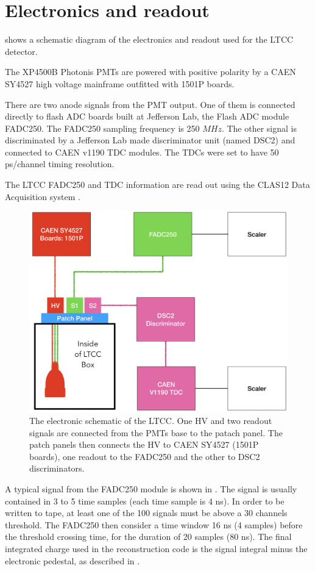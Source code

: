 \section{Electronics and readout}

 shows a schematic diagram of the electronics and readout used for the LTCC detector.

The XP4500B Photonis PMTs are powered with positive polarity by a CAEN SY4527 high voltage mainframe outfitted with 1501P boards.

There are two anode signals from the PMT output. One of them is connected directly to flash ADC
boards built at Jefferson Lab, the Flash ADC module FADC250. The FADC250 sampling frequency is 250 $MHz$.
The other signal is discriminated by a Jefferson Lab made discriminator unit (named DSC2) and connected to CAEN v1190 TDC modules.
The TDCs were set to have 50 ps/channel timing resolution.

The LTCC FADC250 and TDC information are read out using the CLAS12 Data Acquisition system \cite{daq2019}.

\begin{figure}
	\centering
	\includegraphics[width=0.95\columnwidth,keepaspectratio]{img/electronicScheme.png}
	\caption{The electronic schematic of the LTCC. One HV and two readout signals are connected from the PMTs base to the patach panel.
				The patch panels then connects the HV to CAEN SY4527 (1501P boards), one readout to the FADC250 and the other to DSC2 discriminators.}
	\label{fig:electronicScheme}
\end{figure}


A typical signal from the FADC250 module is shown in . The signal is usually contained in 3 to 5 time samples (each time sample is 4 ns).
In order to be written to tape, at least one of the 100 signals must be above a 30 channels threshold. The FADC250 then consider a time window 16 ns (4 samples)
before the threshold crossing time, for the duration of 20 samples (80 ns). The final integrated charge used in the reconstruction code is the signal integral
minus the electronic pedestal, as described in .



